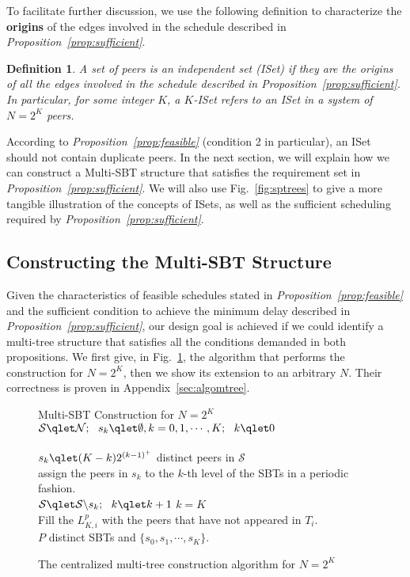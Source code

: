 \documentclass[conference]{IEEEtran}
\newtheorem{defi}{Definition}
\begin{document}
  To facilitate further discussion, we use the following definition to characterize the \textbf{origins} of the edges involved in the schedule described in \textit{Proposition~\ref{prop:sufficient}}.
\vspace{1ex}
  \begin{defi}
  A set of peers is an \textit{independent set} (ISet) if they are the origins of all the edges involved in the schedule described in \textit{Proposition~\ref{prop:sufficient}}. In particular, for some integer $K$, a $K$-ISet refers to an ISet in a system of $N=2^K$ peers.
  \end{defi}
  \vspace{1ex}

  According to \textit{Proposition~\ref{prop:feasible}} (condition 2 in particular), an ISet should not contain duplicate peers. In the next section, we will explain how we can construct a Multi-SBT structure that satisfies the requirement set in \textit{Proposition~\ref{prop:sufficient}}. We will also use Fig.~\ref{fig:sptrees} to give a more tangible illustration of the concepts of ISets, as well as the sufficient scheduling required by \textit{Proposition~\ref{prop:sufficient}}.

\subsection{Constructing the Multi-SBT Structure} \label{sec:csbt}
Given the characteristics of feasible schedules stated in \textit{Proposition~\ref{prop:feasible}} and the sufficient condition to achieve the minimum delay described in \textit{Proposition~\ref{prop:sufficient}}, our design goal is achieved if we could identify a multi-tree structure that satisfies all the conditions demanded in both propositions. We first give, in Fig.~\ref{fig:algomtree}, the algorithm that performs the construction for $N=2^K$, then we show its extension to an arbitrary $N$. Their correctness is proven in Appendix~\ref{sec:algomtree}.
\begin{figure}[htb]
  \begin{algorithm}{Multi-SBT Construction for $N=2^K$}{
  \label{algo:algostd}}
$\mathcal{S} \qlet \mathcal{N};~~s_k \qlet \emptyset, k=0,1,\cdots,K;~~k \qlet 0$ \\
  \qrepeat \\
    $s_k \qlet (K-k)2^{(k-1)^+}$ distinct peers in $\mathcal{S}$ \\
    \qdo assign the peers in $s_k$ to the $k$-th level of the SBTs in a periodic fashion. \\
    $\mathcal{S} \qlet \mathcal{S} \backslash s_k;~~k \qlet k + 1$
  \quntil $k = K$ \\
  Fill the $L^p_{K,i}$ with the peers that have not appeared in $T_i$.\\
  \qreturn $P$ distinct SBTs and $\{s_0, s_1, \cdots, s_K\}$.
  \end{algorithm}\caption{The centralized multi-tree construction algorithm for $N=2^K$} \label{fig:algomtree}
  \end{figure}
\end{document}
